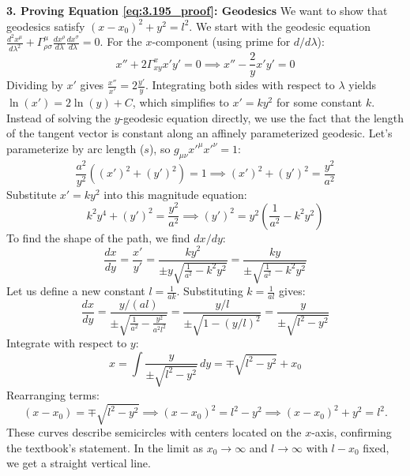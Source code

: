 \documentclass[11pt, a4paper]{report}
\begin{document}
\textbf{3. Proving Equation \eqref{eq:3.195_proof}: Geodesics}
We want to show that geodesics satisfy $(x - x_0)^2 + y^2 = l^2$. We start with the geodesic equation $\frac{d^2 x^\mu}{d\lambda^2} + \Gamma^\mu_{\rho\sigma} \frac{dx^\rho}{d\lambda} \frac{dx^\sigma}{d\lambda} = 0$. 
For the $x$-component (using prime for $d/d\lambda$):
\begin{equation}
x'' + 2\Gamma^x_{xy} x' y' = 0 \implies x'' - \frac{2}{y} x' y' = 0 \label{eq:geo_x}
\end{equation}
Dividing by $x'$ gives $\frac{x''}{x'} = 2 \frac{y'}{y}$. Integrating both sides with respect to $\lambda$ yields $\ln(x') = 2 \ln(y) + C$, which simplifies to $x' = k y^2$ for some constant $k$.
Instead of solving the $y$-geodesic equation directly, we use the fact that the length of the tangent vector is constant along an affinely parameterized geodesic. Let's parameterize by arc length ($s$), so $g_{\mu\nu} x'^\mu x'^\nu = 1$:
\begin{equation}
\frac{a^2}{y^2} \left( (x')^2 + (y')^2 \right) = 1 \implies (x')^2 + (y')^2 = \frac{y^2}{a^2}
\end{equation}
Substitute $x' = k y^2$ into this magnitude equation:
\begin{equation}
k^2 y^4 + (y')^2 = \frac{y^2}{a^2} \implies (y')^2 = y^2 \left( \frac{1}{a^2} - k^2 y^2 \right)
\end{equation}
To find the shape of the path, we find $dx/dy$:
\begin{equation}
\frac{dx}{dy} = \frac{x'}{y'} = \frac{k y^2}{\pm y \sqrt{\frac{1}{a^2} - k^2 y^2}} = \frac{k y}{\pm \sqrt{\frac{1}{a^2} - k^2 y^2}}
\end{equation}
Let us define a new constant $l = \frac{1}{a k}$. Substituting $k = \frac{1}{al}$ gives:
\begin{equation}
\frac{dx}{dy} = \frac{y / (al)}{\pm \sqrt{\frac{1}{a^2} - \frac{y^2}{a^2 l^2}}} = \frac{y/l}{\pm \sqrt{1 - (y/l)^2}} = \frac{y}{\pm \sqrt{l^2 - y^2}}
\end{equation}
Integrate with respect to $y$:
\begin{equation}
x = \int \frac{y}{\pm \sqrt{l^2 - y^2}} \, dy = \mp \sqrt{l^2 - y^2} + x_0
\end{equation}
Rearranging terms:
\begin{equation}
(x - x_0) = \mp \sqrt{l^2 - y^2} \implies (x - x_0)^2 = l^2 - y^2 \implies (x - x_0)^2 + y^2 = l^2. \label{eq:3.195_proof}
\end{equation}
These curves describe semicircles with centers located on the $x$-axis, confirming the textbook's statement. In the limit as $x_0 \to \infty$ and $l \to \infty$ with $l-x_0$ fixed, we get a straight vertical line.
\end{document}
